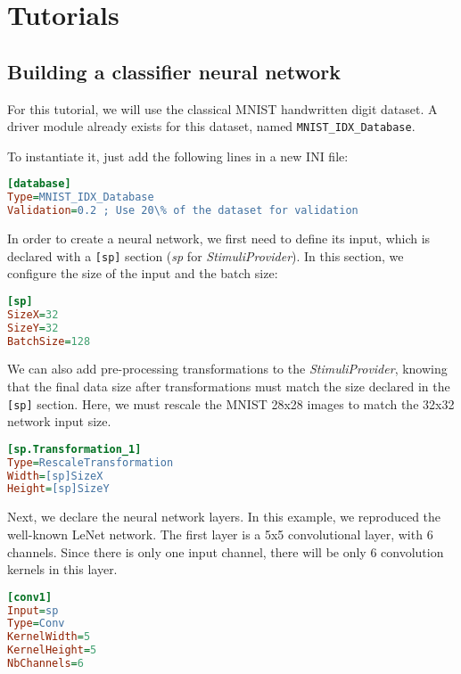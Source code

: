\documentclass[a4paper,11pt,oneside]{article}
\begin{document}
\clearpage

\section{Tutorials}

\subsection{\label{sec:BuildingClassifierNN}Building a classifier neural
network}

For this tutorial, we will use the classical MNIST handwritten digit dataset.
A driver module already exists for this dataset, named
\lstinline!MNIST_IDX_Database!.

To instantiate it, just add the following lines in a new INI file:

\begin{lstlisting}[language=ini]
[database]
Type=MNIST_IDX_Database
Validation=0.2 ; Use 20\% of the dataset for validation
\end{lstlisting}

In order to create a neural network, we first need to define its input, which is
declared with a \lstinline![sp]! section (\emph{sp} for \emph{StimuliProvider}).
In this section, we configure the size of the input and the batch size:

\begin{lstlisting}[language=ini]
[sp]
SizeX=32
SizeY=32
BatchSize=128
\end{lstlisting}

We can also add pre-processing transformations to the \emph{StimuliProvider},
knowing that the final data size after transformations must match the size
declared in the \lstinline![sp]! section. Here, we must rescale the MNIST 28x28
images to match the 32x32 network input size.

\begin{lstlisting}[language=ini]
[sp.Transformation_1]
Type=RescaleTransformation
Width=[sp]SizeX
Height=[sp]SizeY
\end{lstlisting}

Next, we declare the neural network layers. In this example, we reproduced the
well-known LeNet network. The first layer is a 5x5 convolutional layer, with
6 channels. Since there is only one input channel, there will be only 6
convolution kernels in this layer.

\begin{lstlisting}[language=ini]
[conv1]
Input=sp
Type=Conv
KernelWidth=5
KernelHeight=5
NbChannels=6
\end{lstlisting}
\end{document}
